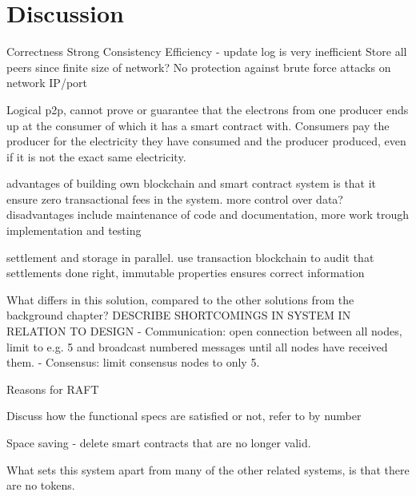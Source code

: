 \chapter{Discussion} \label{discussion}

Correctness
Strong Consistency
Efficiency - update log is very inefficient
Store all peers since finite size of network?
No protection against brute force attacks on network IP/port 

Logical p2p, cannot prove or guarantee that the electrons from one producer ends up at the consumer of which it has a smart contract with. Consumers pay the producer for the electricity they have consumed and the producer produced, even if it is not the exact same electricity.

advantages of building own blockchain and smart contract system is that it ensure zero transactional fees in the system. more control over data?
disadvantages include maintenance of code and documentation, more work trough implementation and testing

settlement and storage in parallel. use transaction blockchain to audit that settlements done right, immutable properties ensures correct information

What differs in this solution, compared to the other solutions from the background chapter?
DESCRIBE SHORTCOMINGS IN SYSTEM IN RELATION TO DESIGN
 - Communication: open connection between all nodes, limit to e.g. 5 and broadcast numbered messages until all nodes have received them. 
 - Consensus: limit consensus nodes to only 5. 
 
Reasons for RAFT

Discuss how the functional specs are satisfied or not, refer to by number

Space saving - delete smart contracts that are no longer valid. 

What sets this system apart from many of the other related systems, is that there are no tokens.


